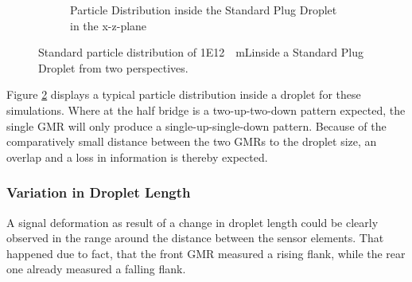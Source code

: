 \begin{figure}[h!]
\begin{subfigure}[r]{0.49\linewidth}
		\caption{Particle Distribution inside the Standard Plug Droplet in the x-z-plane}
		\label{fig:sim:SPD:side}
	\end{subfigure}
	\caption{Standard particle distribution of \SI{1E12}{\per\milli\liter}inside a Standard Plug Droplet from two perspectives.}
	\label{fig:sim:SPD}
\end{figure}


Figure \ref{fig:sim:SPD} displays a typical particle distribution inside a droplet for these simulations. Where at the half bridge is a two-up-two-down pattern expected, the single GMR will only produce a single-up-single-down pattern. Because of the comparatively small distance between the two GMRs to the droplet size, an overlap and a loss in information is thereby expected.
\subsubsection{Variation in Droplet Length}
A signal deformation as result of a change in droplet length could be clearly observed in the range around the distance between the sensor elements. That happened due to fact, that the front GMR measured a rising flank, while the rear one already measured a falling flank.\\
